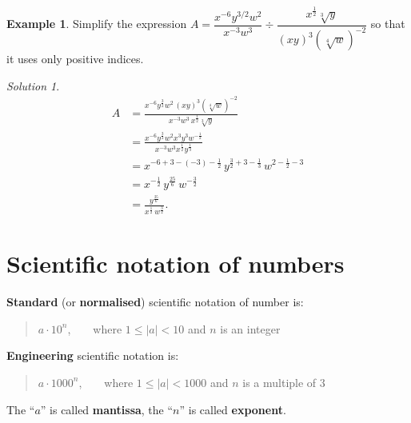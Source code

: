 \documentclass[
  12pt,
  oneside]{book}
\theoremstyle{definition}
\theoremstyle{definition}
\newtheorem{example}{Example}[chapter]
\theoremstyle{definition}
\theoremstyle{definition}
\theoremstyle{remark}
\newtheorem*{solution}{Solution}
\begin{document}
\begin{example}
Simplify the expression \(A=\dfrac{x^{-6}y^{3/2}w^2}{x^{-3}w^3}\div\dfrac{x^\frac12\sqrt[3]{y}}{(xy)^3(\sqrt[4]{w})^{-2}}\) so that it uses only positive indices.
\end{example}

\begin{solution}
\begin{align*}
A&= \frac{x^{-6}y^{\frac{3}{2}}w^2\,(xy)^3(\sqrt[4]{w})^{-2}}{x^{-3}w^3\, x^{\frac{1}{2}}\sqrt[3]{y}}\\
&=\frac{x^{-6}y^{\frac{3}{2}}w^2x^3y^3w^{-\frac12}}{x^{-3}w^3x^{\frac12}y^{\frac13}}\\
&=x^{-6+3-(-3)-\frac12}\,y^{\frac32+3-\frac13}\, w^{2-\frac12-3}\\
&=x^{-\frac12}\,y^{\frac{25}{6}}\,w^{-\frac32}\\
&=\frac{y^{\frac{25}{6}}}{x^{\frac12}\,w^{\frac32}}.
\end{align*}
\end{solution}

\hypertarget{scientific-notation-of-numbers}{%
\section{Scientific notation of numbers}\label{scientific-notation-of-numbers}}

\textbf{Standard} (or \textbf{normalised}) scientific notation of number is:

\begin{quote}
\(a\cdot 10^n\), ~ ~ where \(1\leq|a|<10\) and \(n\) is an integer
\end{quote}

\textbf{Engineering} scientific notation is:

\begin{quote}
\(a\cdot 1000^n\), ~ ~ where \(1\leq|a|<1000\) and \(n\) is a multiple of \(3\)
\end{quote}

The ``\(a\)'' is called \textbf{mantissa}, the ``\(n\)'' is called \textbf{exponent}.
\end{document}
